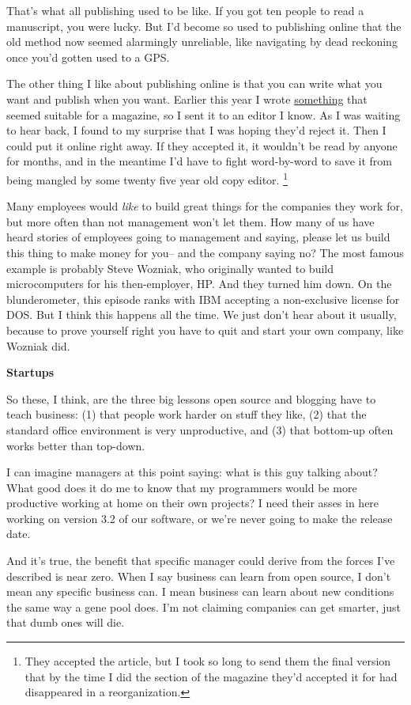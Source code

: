 \documentclass[12pt]{book}
\begin{document}
That's what all publishing used to be like. If you got ten people to
read a manuscript, you were lucky. But I'd become so used to publishing
online that the old method now seemed alarmingly unreliable, like
navigating by dead reckoning once you'd gotten used to a GPS.

The other thing I like about publishing online is that you can write
what you want and publish when you want. Earlier this year I wrote
\href{inequality.html}{something} that seemed suitable for a magazine,
so I sent it to an editor I know. As I was waiting to hear back, I found
to my surprise that I was hoping they'd reject it. Then I could put it
online right away. If they accepted it, it wouldn't be read by anyone
for months, and in the meantime I'd have to fight word-by-word to save
it from being mangled by some twenty five year old copy editor.
\footnote{They accepted the article, but I took so long to send them the
final version that by the time I did the section of the magazine they'd
accepted it for had disappeared in a reorganization.}

Many employees would \emph{like} to build great things for the companies
they work for, but more often than not management won't let them. How
many of us have heard stories of employees going to management and
saying, please let us build this thing to make money for you-- and the
company saying no? The most famous example is probably Steve Wozniak,
who originally wanted to build microcomputers for his then-employer, HP.
And they turned him down. On the blunderometer, this episode ranks with
IBM accepting a non-exclusive license for DOS. But I think this happens
all the time. We just don't hear about it usually, because to prove
yourself right you have to quit and start your own company, like Wozniak
did.

\textbf{Startups}

So these, I think, are the three big lessons open source and blogging
have to teach business: (1) that people work harder on stuff they like,
(2) that the standard office environment is very unproductive, and (3)
that bottom-up often works better than top-down.

I can imagine managers at this point saying: what is this guy talking
about? What good does it do me to know that my programmers would be more
productive working at home on their own projects? I need their asses in
here working on version 3.2 of our software, or we're never going to
make the release date.

And it's true, the benefit that specific manager could derive from the
forces I've described is near zero. When I say business can learn from
open source, I don't mean any specific business can. I mean business can
learn about new conditions the same way a gene pool does. I'm not
claiming companies can get smarter, just that dumb ones will die.
\end{document}

